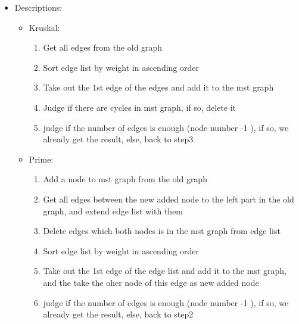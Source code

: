 \begin{itemize}
    \item Descriptions:
        \begin{itemize}
            \item Kruskal:
                \begin{enumerate}
                    \item Get all edges from the old graph
                    \item Sort edge list by weight in ascending order
                    \item Take out the 1st edge of the edges and add it to the mst graph
                    \item Judge if there are cycles in mst graph, if so, delete it
                    \item judge if the number of edges is enough (node number -1 ), if so, we already get the result, else, back to step3
                \end{enumerate}
            \item Prime:
                \begin{enumerate}
                    \item Add a node to mst graph from the old graph
                    \item Get all edges between the new added node to the left part in the old graph, and extend edge list with them
                    \item Delete edges which both nodes is in the mst graph from edge list
                    \item Sort edge list by weight in ascending order
                    \item Take out the 1st edge of the edge list and add it to the mst graph, and the take the oher node of this edge as new added node
                    \item judge if the number of edges is enough (node number -1 ), if so, we already get the result, else, back to step2
                \end{enumerate}
        \end{itemize}
\end{itemize}